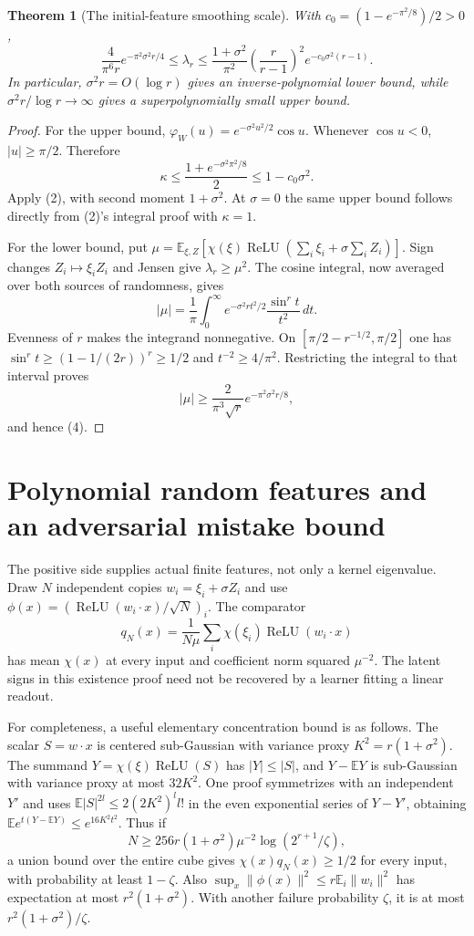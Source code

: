 \documentclass[11pt]{article}
\newtheorem{theorem}{Theorem}\newtheorem{lemma}[theorem]{Lemma}
\newcommand{\E}{\mathbb E}\newcommand{\R}{\mathbb R}
\newcommand{\relu}{\operatorname{ReLU}}
\begin{document}
\begin{theorem}[The initial-feature smoothing scale]\label{thm:smoothing}
With $c_0=(1-e^{-\pi^2/8})/2>0$,
\[
 \frac4{\pi^6r}e^{-\pi^2\sigma^2r/4}
 \le\lambda_r\le
 \frac{1+\sigma^2}{\pi^2}\left(\frac r{r-1}\right)^2
                           e^{-c_0\sigma^2(r-1)}.       \tag{4}
\]
In particular, $\sigma^2r=O(\log r)$ gives an inverse-polynomial
lower bound, while $\sigma^2r/\log r\to\infty$ gives a
superpolynomially small upper bound.
\end{theorem}
\begin{proof}
For the upper bound, $\varphi_W(u)=e^{-\sigma^2u^2/2}\cos u$.
Whenever $\cos u<0$, $|u|\ge\pi/2$. Therefore
\[
 \kappa\le\frac{1+e^{-\sigma^2\pi^2/8}}2
                    \le1-c_0\sigma^2.
\]
Apply (2), with second moment $1+\sigma^2$.
At $\sigma=0$ the same upper bound follows directly from (2)'s
integral proof with $\kappa=1$.

For the lower bound, put
$\mu=\E_{\xi,Z}[\chi(\xi)\relu(\sum_i\xi_i+\sigma\sum_iZ_i)]$.
Sign changes $Z_i\mapsto\xi_iZ_i$ and Jensen give
$\lambda_r\ge\mu^2$.
The cosine integral, now averaged over both sources of randomness, gives
\[
 |\mu|=\frac1\pi\int_0^\infty
           e^{-\sigma^2r t^2/2}\frac{\sin^r t}{t^2}\,dt.
 \tag{5}
\]
Evenness of $r$ makes the integrand nonnegative.
On $[\pi/2-r^{-1/2},\pi/2]$ one has
$\sin^r t\ge(1-1/(2r))^r\ge1/2$ and $t^{-2}\ge4/\pi^2$.
Restricting the integral to that interval proves
\[
                |\mu|\ge\frac2{\pi^3\sqrt r}
                                    e^{-\pi^2\sigma^2r/8}, \tag{6}
\]
and hence (4).
\end{proof}

\section{Polynomial random features and an adversarial mistake bound}
The positive side supplies actual finite features, not only a kernel
eigenvalue. Draw $N$ independent copies $w_i=\xi_i+\sigma Z_i$ and
use $\phi(x)=(\relu(w_i\cdot x)/\sqrt N)_i$.
The comparator
\[
 q_N(x)=\frac1{N\mu}\sum_i\chi(\xi_i)\relu(w_i\cdot x)
 \tag{7}
\]
has mean $\chi(x)$ at every input and coefficient norm squared
$\mu^{-2}$. The latent signs in this existence proof need not be
recovered by a learner fitting a linear readout.

For completeness, a useful elementary concentration bound is as follows.
The scalar $S=w\cdot x$ is centered sub-Gaussian with variance proxy
$K^2=r(1+\sigma^2)$. The summand
$Y=\chi(\xi)\relu(S)$ has $|Y|\le|S|$, and $Y-\E Y$ is
sub-Gaussian with variance proxy at most $32K^2$.
One proof symmetrizes with an independent $Y'$ and uses
$\E|S|^{2l}\le2(2K^2)^l l!$ in the even exponential series of
$Y-Y'$, obtaining $\E e^{t(Y-\E Y)}\le e^{16K^2t^2}$.
Thus if
\[
 N\ge256r(1+\sigma^2)\mu^{-2}\log(2^{r+1}/\zeta),     \tag{8}
\]
a union bound over the entire cube gives
$\chi(x)q_N(x)\ge1/2$ for every input, with probability at least
$1-\zeta$.
Also
$\sup_x\|\phi(x)\|^2\le r\E_i\|w_i\|^2$ has expectation at
most $r^2(1+\sigma^2)$. With another failure probability $\zeta$,
it is at most $r^2(1+\sigma^2)/\zeta$.
\end{document}
